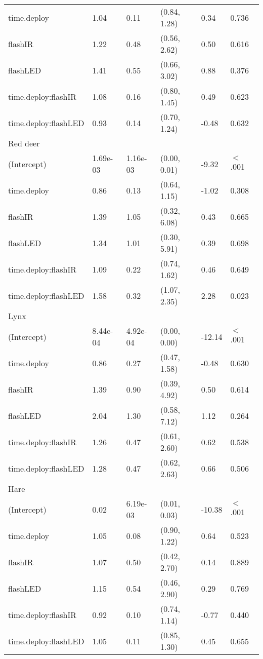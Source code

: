 \begin{table}[ht]
\begin{tabular}{llllll}
  time.deploy & 1.04 & 0.11 & (0.84, 1.28) & 0.34 & 0.736  \\ 
  flashIR & 1.22 & 0.48 & (0.56, 2.62) & 0.50 & 0.616  \\ 
  flashLED & 1.41 & 0.55 & (0.66, 3.02) & 0.88 & 0.376  \\ 
  time.deploy:flashIR & 1.08 & 0.16 & (0.80, 1.45) & 0.49 & 0.623  \\ 
  time.deploy:flashLED & 0.93 & 0.14 & (0.70, 1.24) & -0.48 & 0.632  \\ 
  Red deer &  &  &  &  &        \\ 
  (Intercept) & 1.69e-03 & 1.16e-03 & (0.00, 0.01) & -9.32 & $<$ .001 \\ 
  time.deploy & 0.86 & 0.13 & (0.64, 1.15) & -1.02 & 0.308  \\ 
  flashIR & 1.39 & 1.05 & (0.32, 6.08) & 0.43 & 0.665  \\ 
  flashLED & 1.34 & 1.01 & (0.30, 5.91) & 0.39 & 0.698  \\ 
  time.deploy:flashIR & 1.09 & 0.22 & (0.74, 1.62) & 0.46 & 0.649  \\ 
  time.deploy:flashLED & 1.58 & 0.32 & (1.07, 2.35) & 2.28 & 0.023  \\ 
  Lynx &  &  &  &  &        \\ 
  (Intercept) & 8.44e-04 & 4.92e-04 & (0.00, 0.00) & -12.14 & $<$ .001 \\ 
  time.deploy & 0.86 & 0.27 & (0.47, 1.58) & -0.48 & 0.630  \\ 
  flashIR & 1.39 & 0.90 & (0.39, 4.92) & 0.50 & 0.614  \\ 
  flashLED & 2.04 & 1.30 & (0.58, 7.12) & 1.12 & 0.264  \\ 
  time.deploy:flashIR & 1.26 & 0.47 & (0.61, 2.60) & 0.62 & 0.538  \\ 
  time.deploy:flashLED & 1.28 & 0.47 & (0.62, 2.63) & 0.66 & 0.506  \\ 
  Hare &  &  &  &  &        \\ 
  (Intercept) & 0.02 & 6.19e-03 & (0.01, 0.03) & -10.38 & $<$ .001 \\ 
  time.deploy & 1.05 & 0.08 & (0.90, 1.22) & 0.64 & 0.523  \\ 
  flashIR & 1.07 & 0.50 & (0.42, 2.70) & 0.14 & 0.889  \\ 
  flashLED & 1.15 & 0.54 & (0.46, 2.90) & 0.29 & 0.769  \\ 
  time.deploy:flashIR & 0.92 & 0.10 & (0.74, 1.14) & -0.77 & 0.440  \\ 
  time.deploy:flashLED & 1.05 & 0.11 & (0.85, 1.30) & 0.45 & 0.655  \\ 

\end{tabular}
\end{table}
